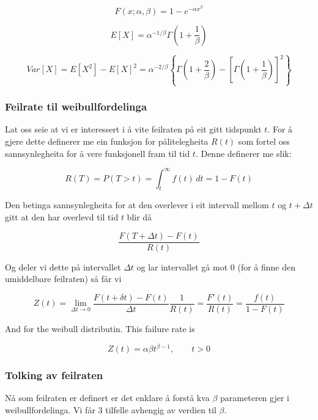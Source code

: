 \begin{equation}
    F(x; \alpha, \beta) = 1 - e^{-\alpha x^\beta}
\end{equation}

\begin{equation}
    E[X] = \alpha^{-1/\beta}\Gamma(1 + \frac{1}{\beta})
\end{equation}

\begin{equation}
    Var[X] = E[X^2] - E[X]^2 = \alpha^{-2/\beta} \left\{ \Gamma\left(1 + \frac{2}{\beta}\right) - 
    \left[ \Gamma \left(1 + \frac{1}{\beta} \right)
    \right]^2\right\}
\end{equation}

\subsubsection{Feilrate til weibullfordelinga}
Lat oss seie at vi er interessert i å vite feilraten på eit gitt tidspunkt $t$. For å gjere dette definerer me ein funksjon for pålitelegheita $R(t)$ som fortel oss sannsynlegheita for å vere funksjonell fram til tid $t$. Denne definerer me slik:

\begin{equation*}
    R(T) = P(T > t) = \int_t^\infty f(t) \,dt = 1 - F(t)
\end{equation*}

Den betinga sannsynlegheita for at den overlever i eit intervall mellom $t$ og $t + \Delta t$ gitt at den har overlevd til tid $t$ blir då

\begin{equation*}
    \frac{F(T + \Delta t) - F(t)}{R(t)}
\end{equation*}

Og deler vi dette på intervallet $\Delta t$ og lar intervallet gå mot 0 (for å finne den umiddelbare feilraten) så får vi

\begin{equation}
    Z(t) = \lim_{\Delta t \rightarrow 0} \frac{F(t + \delta t) - F(t)}{\Delta t} \frac{1}{R(t)} = \frac{F'(t)}{R(t)} = \frac{f(t)}{1 - F(t)}
\end{equation}

And for the weibull distributin. This failure rate is 

\begin{equation}
    Z(t) = \alpha \beta t^{\beta - 1}, \qquad t > 0
\end{equation}

\subsubsection{Tolking av feilraten}
Nå som feilraten er definert er det enklare å forstå kva $\beta$ parameteren gjer i weibullfordelinga. Vi får 3 tilfelle avhengig av verdien til $\beta$.

